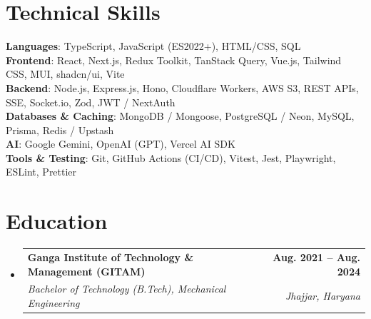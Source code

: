 \documentclass[letterpaper,11pt]{article}
\makeatletter
\newcommand{\resumeSubheading}[4]{
  \vspace{-2pt}\item
    \begin{tabular*}{1.0\textwidth}[t]{l@{\extracolsep{\fill}}r}
      \textbf{#1} & \textbf{\small #2} \\
      \textit{\small#3} & \textit{\small #4} \\
    \end{tabular*}\vspace{-7pt}
}
\newcommand{\resumeSubHeadingListStart}{\begin{itemize}[leftmargin=0.0in, label={}]}
\newcommand{\resumeSubHeadingListEnd}{\end{itemize}}
\makeatother
\begin{document}
\section{Technical Skills}
 \begin{itemize}[leftmargin=0.15in, label={}]
    \small{\item{
     \textbf{Languages}{: TypeScript, JavaScript (ES2022+), HTML/CSS, SQL} \\
     \textbf{Frontend}{: React, Next.js, Redux Toolkit, TanStack Query, Vue.js, Tailwind CSS, MUI, shadcn/ui, Vite} \\
     \textbf{Backend}{: Node.js, Express.js, Hono, Cloudflare Workers, AWS S3, REST APIs, SSE, Socket.io, Zod, JWT / NextAuth} \\
     \textbf{Databases \& Caching}{: MongoDB / Mongoose, PostgreSQL / Neon, MySQL, Prisma, Redis / Upstash} \\
     \textbf{AI}{: Google Gemini, OpenAI (GPT), Vercel AI SDK} \\
     \textbf{Tools \& Testing}{: Git, GitHub Actions (CI/CD), Vitest, Jest, Playwright, ESLint, Prettier} \\
    }}
 \end{itemize}
\vspace{-9pt}

\section{Education}
  \resumeSubHeadingListStart
    \resumeSubheading
      {Ganga Institute of Technology \& Management (GITAM)}{Aug. 2021 -- Aug. 2024}
      {Bachelor of Technology (B.Tech), Mechanical Engineering}{Jhajjar, Haryana}
  \resumeSubHeadingListEnd
\end{document}
